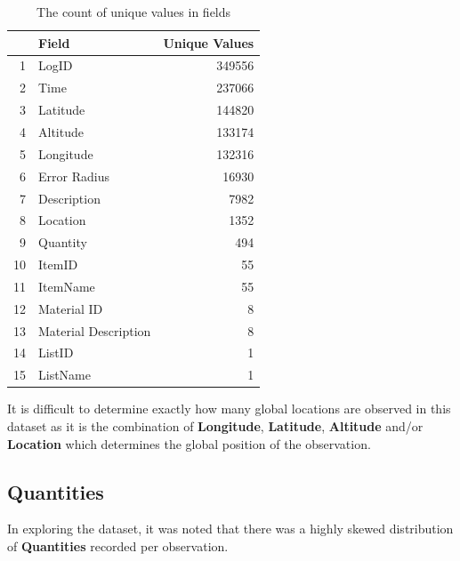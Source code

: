 \documentclass[10pt]{article}\usepackage[]{graphicx}\usepackage[]{color}
\begin{document}
\begin{table}[ht]
\centering
\begin{tabular}{rlr}
  \hline
 & Field & Unique Values \\ 
  \hline
1 & LogID & 349556 \\ 
  2 & Time & 237066 \\ 
  3 & Latitude & 144820 \\ 
  4 & Altitude & 133174 \\ 
  5 & Longitude & 132316 \\ 
  6 & Error Radius & 16930 \\ 
  7 & Description & 7982 \\ 
  8 & Location & 1352 \\ 
  9 & Quantity & 494 \\ 
  10 & ItemID &  55 \\ 
  11 & ItemName &  55 \\ 
  12 & Material ID &   8 \\ 
  13 & Material Description &   8 \\ 
  14 & ListID &   1 \\ 
  15 & ListName &   1 \\ 
   \hline
\end{tabular}
\caption{The count of unique values in fields} 
\label{tab:unique}
\end{table}


It is difficult to determine exactly how many global locations are observed in this dataset as it is the combination of \textbf{Longitude}, \textbf{Latitude}, \textbf{Altitude} and/or \textbf{Location} which determines the global position of the observation. 


\pagebreak
\subsection{Quantities}\label{quantities}

In exploring the dataset, it was noted that there was a highly skewed distribution of \textbf{Quantities} recorded per observation.
\end{document}
